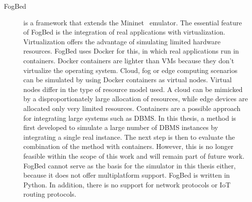 \documentclass[english,version-2019-11]{uzl-thesis}
\begin{document}
\begin{description}
\item[FogBed]\cite{simulator_FogBed} is a framework that extends the Mininet~\cite{simulator_Mininet} emulator. The essential feature of FogBed is the integration of real applications with virtualization. Virtualization offers the advantage of simulating limited hardware resources. FogBed uses Docker for this, in which real applications run in containers. Docker containers are lighter than VMs because they don't virtualize the operating system. Cloud, fog or edge computing scenarios can be simulated by using Docker containers as virtual nodes. Virtual nodes differ in the type of resource model used. A cloud can be mimicked by a disproportionately large allocation of resources, while edge devices are allocated only very limited resources. Containers are a possible approach for integrating large systems such as DBMS. In this thesis, a method is first developed to simulate a large number of DBMS instances by integrating a single real instance. The next step is then to evaluate the combination of the method with containers. However, this is no longer feasible within the scope of this work and will remain part of future work. FogBed cannot serve as the basis for the simulator in this thesis either, because it does not offer multiplatform support. FogBed is written in Python. In addition, there is no support for network protocols or IoT routing protocols.
\end{description}
\newcommand{\RNum}[1]{\uppercase\expandafter{\romannumeral #1\relax}}
\end{document}
